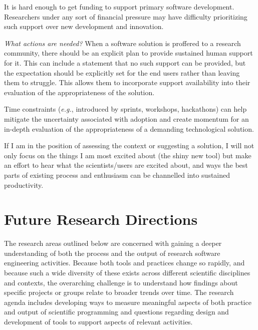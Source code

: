 \documentclass[a4paper,UKenglish]{dagman}
\newcommand{\eg}{\emph{e.g.},\xspace}
\begin{document}
It is hard enough to get funding to support primary software development. Researchers under any sort of financial pressure may have difficulty prioritizing such support over new development and innovation. 

\emph{What actions are needed?}
When a software solution is proffered to a research community, there should be an explicit plan to provide sustained human support for it. This can include a statement that no such support can be provided, but the expectation should be explicitly set for the end users rather than leaving them to struggle. This allows them to incorporate support availability into their evaluation of the appropriateness of the solution. 


Time constraints (\eg introduced by sprints, workshops, hackathons) can help mitigate the uncertainty associated with adoption and create momentum for an in-depth evaluation of the appropriateness of a demanding technological solution.

If I am in the position of assessing the context or suggesting a solution, I will not only focus on the things I am most excited about (the shiny new tool) but make an effort to hear what the scientists/users are excited about, and ways the best parts of existing process and enthusiasm can be channelled into sustained productivity.

\section{Future Research Directions}

The research areas outlined below are concerned with gaining a deeper understanding of both the process and the output of research software engineering activities. Because both tools and practices change so rapidly, and because such a wide diversity of these exists across different scientific disciplines and contexts, the overarching challenge is to understand how findings about specific projects or groups relate to broader trends over time. The research agenda includes developing ways to measure meaningful aspects of both practice and output of scientific programming and questions regarding design and development of tools to support aspects of relevant activities.
\end{document}
